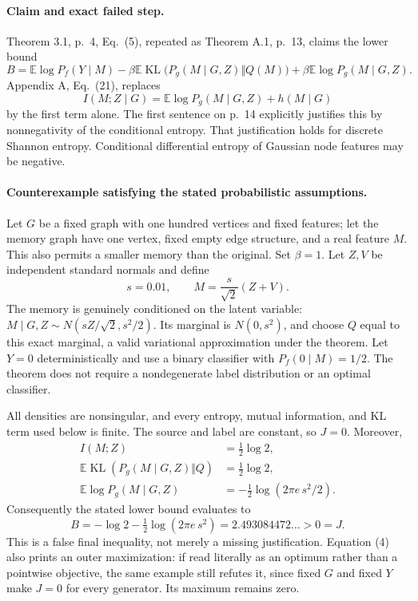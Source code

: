 \documentclass[10pt]{article}
\begin{document}
\paragraph*{Claim and exact failed step.}\mbox{}\par
Theorem 3.1, p. 4, Eq. (5), repeated as Theorem A.1, p. 13, claims the lower bound \[B=\mathbb E\log P_f(Y\mid M)
-\beta\mathbb E\operatorname{KL}\bigl(P_g(M\mid G,Z)\Vert Q(M)\bigr)
+\beta\mathbb E\log P_g(M\mid G,Z).\] Appendix A, Eq. (21), replaces \[I(M;Z\mid G)=\mathbb E\log P_g(M\mid G,Z)+h(M\mid G)\] by the first term alone. The first sentence on p. 14 explicitly justifies this by nonnegativity of the conditional entropy. That justification holds for discrete Shannon entropy. Conditional differential entropy of Gaussian node features may be negative.\par
\paragraph*{Counterexample satisfying the stated probabilistic assumptions.}\mbox{}\par
Let \(G\) be a fixed graph with one hundred vertices and fixed features; let the memory graph have one vertex, fixed empty edge structure, and a real feature \(M\). This also permits a smaller memory than the original. Set \(\beta=1\). Let \(Z,V\) be independent standard normals and define \[s=0.01,\qquad M=\frac{s}{\sqrt2}(Z+V).\] The memory is genuinely conditioned on the latent variable: \(M\mid G,Z\sim N(sZ/\sqrt2,s^2/2)\). Its marginal is \(N(0,s^2)\), and choose \(Q\) equal to this exact marginal, a valid variational approximation under the theorem. Let \(Y=0\) deterministically and use a binary classifier with \(P_f(0\mid M)=1/2\). The theorem does not require a nondegenerate label distribution or an optimal classifier.\par
All densities are nonsingular, and every entropy, mutual information, and KL term used below is finite. The source and label are constant, so \(J=0\). Moreover, \[\begin{aligned}
I(M;Z)&=\tfrac12\log2,\\
\mathbb E\operatorname{KL}(P_g(M\mid G,Z)\Vert Q)
 &=\tfrac12\log2,\\
\mathbb E\log P_g(M\mid G,Z)
 &=-\tfrac12\log(2\pi e\,s^2/2).\end{aligned}\] Consequently the stated lower bound evaluates to \[B=-\log2-\tfrac12\log(2\pi e\,s^2)
=2.493084472\ldots>0=J.\] This is a false final inequality, not merely a missing justification. Equation (4) also prints an outer maximization: if read literally as an optimum rather than a pointwise objective, the same example still refutes it, since fixed \(G\) and fixed \(Y\) make \(J=0\) for every generator. Its maximum remains zero.\par
\end{document}
